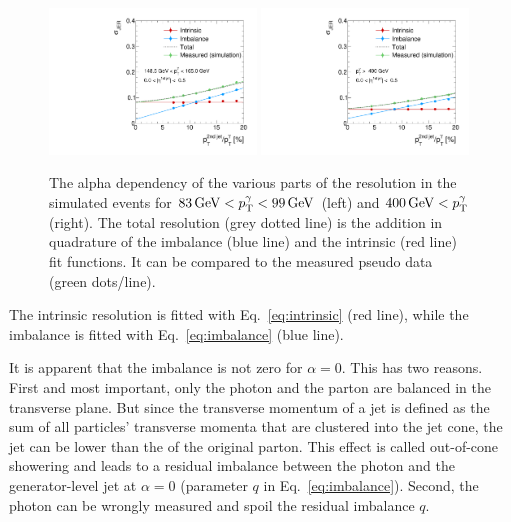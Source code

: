 \begin{figure}[!b]
 \centering
    \includegraphics[width=0.49\textwidth]{figures/resolution/methodology/JER_for_1_eta_bin_6_pTGamma_bin_wo_data_PFCHS_RMS99_mc.pdf} 
    \includegraphics[width=0.49\textwidth]{figures/resolution/methodology/JER_for_1_eta_bin_12_pTGamma_bin_wo_data_PFCHS_RMS99_mc.pdf} 
  \caption{The alpha dependency of the various parts of the resolution in the simulated events for $83 \,\text{Ge}\kern-0.06667em\text{V} < p_{\text{T}}^{\gamma} < 99 \,\text{Ge}\kern-0.06667em\text{V} $ (left) and $400 \,\text{Ge}\kern-0.06667em\text{V} < p_{\text{T}}^{\gamma}$ (right). 
           The total resolution (grey dotted line) is the addition in quadrature of the imbalance (blue line) and the intrinsic (red line) fit functions. 
           It can be compared to the measured pseudo data (green dots/line).}  
 \label{fig:AlphaDependenceOfResolutions}
\end{figure}
The intrinsic resolution is fitted with Eq.~\eqref{eq:intrinsic} (red line), while the imbalance is fitted with Eq.~\eqref{eq:imbalance} (blue line).

It is apparent that the imbalance is not zero for $\alpha=0$. 
This has two reasons.
First and most important, only the photon and the parton are balanced in the transverse plane.
But since the transverse momentum of a jet is defined as the sum of all particles' transverse momenta that are clustered into the jet cone, the jet \pt can be lower than the \pt of the original parton.
This effect is called out-of-cone showering and leads to a residual imbalance between the photon \pt and the generator-level jet \pt at $\alpha=0$ (parameter $q$ in Eq.~\eqref{eq:imbalance}).
Second, the photon \pt can be wrongly measured and spoil the residual imbalance $q$. 

